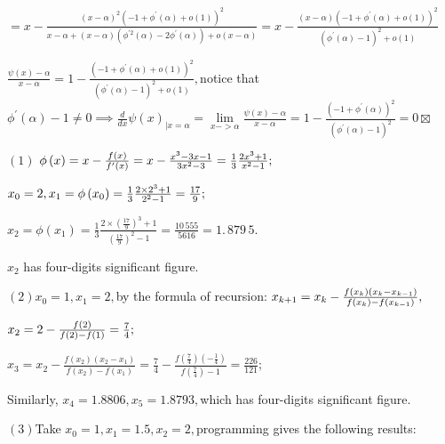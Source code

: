 \documentclass{article}
\begin{document}
$=x-\frac{\left( x-\alpha \right) ^{2}\left( -1+\phi ^{\prime }\left( \alpha
\right) +o\left( 1\right) \right) ^{2}}{x-\alpha +\left( x-\alpha \right)
(\phi ^{\prime 2}\left( \alpha \right) -2\phi ^{\prime }\left( \alpha
\right) )+o(x-\alpha )}=x-\frac{\left( x-\alpha \right) \left( -1+\phi
^{\prime }\left( \alpha \right) +o\left( 1\right) \right) ^{2}}{\left( \phi
^{\prime }\left( \alpha \right) -1\right) ^{2}+o(1)}$

$\frac{\psi \left( x\right) -\alpha }{x-\alpha }=1-\frac{\left( -1+\phi
^{\prime }\left( \alpha \right) +o\left( 1\right) \right) ^{2}}{\left( \phi
^{\prime }\left( \alpha \right) -1\right) ^{2}+o(1)},$notice that $\phi
^{\prime }\left( \alpha \right) -1\neq 0\implies \frac{d}{dx}\psi \left(
x\right) _{|x=\alpha }=\underset{x->\alpha }{\lim }\frac{\psi \left(
x\right) -\alpha }{x-\alpha }=1-\frac{\left( -1+\phi ^{\prime }\left( \alpha
\right) \right) ^{2}}{\left( \phi ^{\prime }\left( \alpha \right) -1\right)
^{2}}=0\boxtimes $


$\left( 1\right) $ $\phi \left( x\right) =x-\frac{f\left( x\right) }{%
f^{\prime }\left( x\right) }=x-\frac{x^{3}-3x-1}{3x^{2}-3}=\allowbreak \frac{%
1}{3}\frac{2x^{3}+1}{x^{2}-1};$

$x_{0}=2,x_{1}=\phi \left( x_{0}\right) =\allowbreak \frac{1}{3}\frac{%
2\times 2^{3}+1}{2^{2}-1}=\allowbreak \frac{17}{9};$

$x_{2}=\phi \left( x_{1}\right) =\allowbreak \frac{1}{3}\frac{2\times \left( 
\frac{17}{9}\right) ^{3}+1}{\left( \frac{17}{9}\right) ^{2}-1}=\allowbreak 
\frac{10\,555}{5616}=\allowbreak 1.\,\allowbreak 879\,5.$

$x_{2}$ has four-digits significant figure.

$\left( 2\right) x_{0}=1,x_{1}=2,$by the formula of recursion: $%
x_{k+1}=x_{k}-\frac{f\left( x_{k}\right) \left( x_{k}-x_{k-1}\right) }{%
f\left( x_{k}\right) -f\left( x_{k-1}\right) },$

$x_{2}=2-\frac{f\left( 2\right) }{f\left( 2\right) -f\left( 1\right) }=\frac{%
7}{4};$

$x_{3}=x_{2}-\frac{f\left( x_{2}\right) \left( x_{2}-x_{1}\right) }{f\left(
x_{2}\right) -f\left( x_{1}\right) }=\frac{7}{4}-\frac{f\left( \frac{7}{4}%
\right) \left( -\frac{1}{4}\right) }{f\left( \frac{7}{4}\right) -1}=\frac{226%
}{121};$

Similarly, $x_{4}=1.8806,x_{5}=1.8793,$which has four-digits significant
figure.

$\left( 3\right) $Take $x_{0}=1,x_{1}=1.5,x_{2}=2,$programming gives the
following results:
\end{document}

